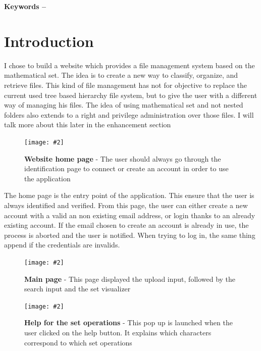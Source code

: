 \documentclass[10pt, a4paper]{article}
\title{\mytitle}
\author{\myauthor\hspace{1em}\\\contact\\Edinburgh Napier University\hspace{0.5em}-\hspace{0.5em}\mymodule}
\date{}
\newcommand{\figuremacro}[5]{
    \begin{figure}[#1]
        \centering
        \texttt{[image: \#2]}
        \caption[#3]{\textbf{#3}#4}
        \label{fig:#2}
    \end{figure}
}
\begin{document}
    \maketitle
    \begin{abstract}
	This document is a report for the second coursework in the advanced web technologies module\cite{module}. For this coursework, we had to build a web application prototype. The objective is to demonstrate our understanding of server-side web development, mastery of the Python Flask micro-framework and the role of HTTP and related protocols in the design of robust and scalable web application. We should achieve this by completing a personal project in which we design, implement, and evaluate a web application on a topic of our choice.
    \end{abstract}

\textbf{Keywords -- }{\mykeywords} 

\section{Introduction}
I chose to build a website which provides a file management system based on the mathematical set. The idea is to create a new way to classify, organize, and retrieve files. This kind of file management has not for objective to replace the current used tree based hierarchy file system, but to give the user with a different way of managing his files. The idea of using mathematical set and not nested folders also extends to a right and privilege administration over those files. I will talk more about this later in the enhancement section

\figuremacro{h}{home}{Website home page}{ - The user should always go through the identification page to connect or create an account in order to use the application}{1.0}

The home page is the entry point of the application. This ensure that the user is always identified and verified. From this page, the user can either create a new account with a valid an non existing email address, or login thanks to an already existing account. If the email chosen to create an account is already in use, the process is aborted and the user is notified. When trying to log in, the same thing append if the credentials are invalids.

\figuremacro{h}{menu}{Main page}{ - This page displayed the upload input, followed by the search input and the set visualizer}{1.0}

\figuremacro{h}{help}{Help for the set operations}{ - This pop up is launched when the user clicked on the help button. It explains which characters correspond to which set operations}{1.0}
\end{document}
